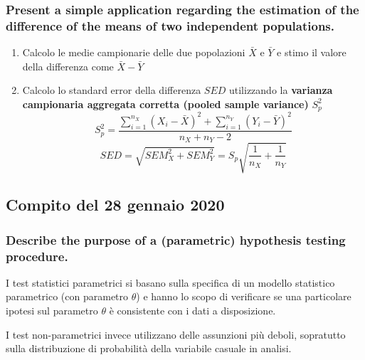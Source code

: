 \documentclass[
]{article}
\begin{document}
\hypertarget{present-a-simple-application-regarding-the-estimation-of-the-difference-of-the-means-of-two-independent-populations.}{%
\subsubsection{Present a simple application regarding the estimation of
the difference of the means of two independent
populations.}\label{present-a-simple-application-regarding-the-estimation-of-the-difference-of-the-means-of-two-independent-populations.}}

\begin{enumerate}
\def\labelenumi{\arabic{enumi}.}
\item
  Calcolo le medie campionarie delle due popolazioni \(\bar{X}\) e
  \(\bar{Y}\) e stimo il valore della differenza come
  \(\bar{X} - \bar{Y}\)
\item
  Calcolo lo standard error della differenza \(SED\) utilizzando la
  \textbf{varianza campionaria aggregata corretta (pooled sample
  variance)} \(S_p^2\)
  \[ S_p^2 = \frac{\sum_{i=1}^{n_X}(X_i - \bar{X})^2+\sum_{i=1}^{n_Y}(Y_i - \bar{Y})^2}{n_X + n_Y - 2} \]
  \[ SED = \sqrt{SEM_X^2 + SEM_Y^2} = S_p\sqrt{\frac{1}{n_X} + \frac{1}{n_Y}}\]
\end{enumerate}

\hypertarget{compito-del-28-gennaio-2020}{%
\subsection{Compito del 28 gennaio
2020}\label{compito-del-28-gennaio-2020}}

\hypertarget{describe-the-purpose-of-a-parametric-hypothesis-testing-procedure.}{%
\subsubsection{Describe the purpose of a (parametric) hypothesis testing
procedure.}\label{describe-the-purpose-of-a-parametric-hypothesis-testing-procedure.}}

I test statistici parametrici si basano sulla specifica di un modello
statistico parametrico (con parametro \(\theta\)) e hanno lo scopo di
verificare se una particolare ipotesi sul parametro \(\theta\) è
consistente con i dati a disposizione.

I test non-parametrici invece utilizzano delle assunzioni più deboli,
sopratutto sulla distribuzione di probabilità della variabile casuale in
analisi.
\end{document}
